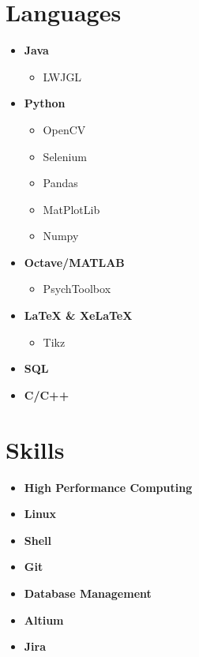 \documentclass[]{chandan-cv}
\begin{document}
\begin{minipage}[t]{0.33\textwidth}


\section{Languages}
	\begin{itemize}
		\setlength\itemsep{0em}
		\item \textbf{Java}
			\begin{itemize}
				\setlength\itemsep{0em}
				\item LWJGL
			\end{itemize}
		\item \textbf{Python}
			\begin{itemize}
				\setlength\itemsep{0em}
				\item OpenCV
				\item Selenium
				\item Pandas
				\item MatPlotLib
				\item Numpy
			\end{itemize}
		\item \textbf{Octave/MATLAB}
			\begin{itemize}
				\setlength\itemsep{0em}
				\item PsychToolbox
			\end{itemize}
		\item \textbf{LaTeX \& XeLaTeX}
			\begin{itemize}
				\setlength\itemsep{0em}
				\item Tikz
			\end{itemize}
		\item \textbf{SQL}
		\item \textbf{C/C++}
	\end{itemize}
\sectionsep


\section{Skills}
	\begin{itemize}
		\setlength\itemsep{0em}
		\item \textbf{High Performance Computing}
		\item \textbf{Linux}
		\item \textbf{Shell}
		\item \textbf{Git}
		\item \textbf{Database Management}
		\item \textbf{Altium}
		\item \textbf{Jira}
	\end{itemize}
\sectionsep


\end{minipage}
\end{document}
